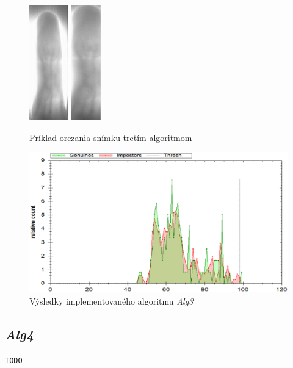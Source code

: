\documentclass[11pt,a4paper]{article}
\begin{document}
\vfill
\begin{figure}[ht!]
	\centering
	\includegraphics[height=5cm]{fig/alg3_in.eps}
	\includegraphics[height=5cm]{fig/alg3_out.eps}
	\caption{\label{fig:alg_out} Príklad orezania snímku tretím algoritmom}
\end{figure}

\vfill

\begin{figure}[ht!]
	\centering
		\includegraphics[width=17cm]{fig/alg3.eps}
	\caption{\label{fig:alg3} Výsledky implementovaného algoritmu \emph{Alg3}}
\end{figure}
\vfill

\clearpage
\subsection{\emph{Alg4}\,--\,} \label{alg4}
\texttt{TODO}
\lipsum[1-32]
\end{document}
